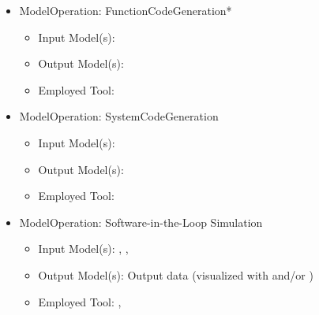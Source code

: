 
\begin{itemize}
    \item ModelOperation: FunctionCodeGeneration*
    \begin{itemize}
        \item Input Model(s): \CPSLabControlModel
        \item Output Model(s): \CPSLabControlModelCode
        \item Employed Tool: \dSPACETargetLink {}
    \end{itemize}
    \item ModelOperation: SystemCodeGeneration
    \begin{itemize}
        \item Input Model(s): \CPSLabSystemModel
        \item Output Model(s): \CPSLabSystemModelCode
        \item Employed Tool: \dSPACESystemDesk {}
    \end{itemize}
    \item ModelOperation: Software-in-the-Loop Simulation
    \begin{itemize}
        \item Input Model(s): \CPSLabControlModelCode*, \CPSLabSystemModelCode, \CPSLabRobotModel
        \item Output Model(s): Output data (visualized with \MATLABSimulinkSimulator and/or \FESTORobotinoView)
        \item Employed Tool: \DesktopExecution, \FESTORobotinoSim {}
    \end{itemize}
\end{itemize}


